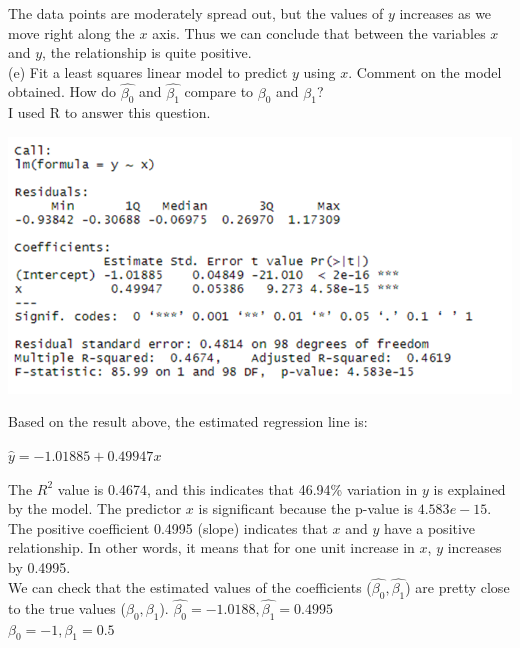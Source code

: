 \documentclass{article}
\begin{document}
\indent \indent The data points are moderately spread out, but the values of $y$ increases as we move right along the $x$ axis. Thus we can conclude that between the variables $x$ and $y$, the relationship is quite positive. \\
\linebreak (e) Fit a least squares linear model to predict $y$ using $x$. Comment on the model obtained. How do $\hat{\beta_0}$ and $\hat{\beta_1}$ compare to $\beta_0$ and $\beta_1$? \\
\indent I used R to answer this question.
\begin{center}
\includegraphics[scale = 0.46]{5.13.e.png} \\
\end{center}
\indent \indent Based on the result above, the estimated regression line is: 
\begin{center}
    $\hat{y} = -1.01885 + 0.49947x$
\end{center} 
\indent \indent The $R^2$ value is 0.4674, and this indicates that 46.94\% variation in $y$ is explained by the model. The predictor $x$ is significant because the p-value is $4.583e-15$. The positive coefficient 0.4995 (slope) indicates that $x$ and $y$ have a positive relationship. In other words, it means that for one unit increase in $x$, $y$ increases by 0.4995. \\
\indent We can check that the estimated values of the coefficients ($\hat{\beta_0}, \hat{\beta_1}$) are pretty close to the true values ($\beta_0, \beta_1$).
$\hat{\beta_0} = -1.0188, \hat{\beta_1} = 0.4995$ \\
$\beta_0 = -1, \beta_1 = 0.5$
\end{document}

